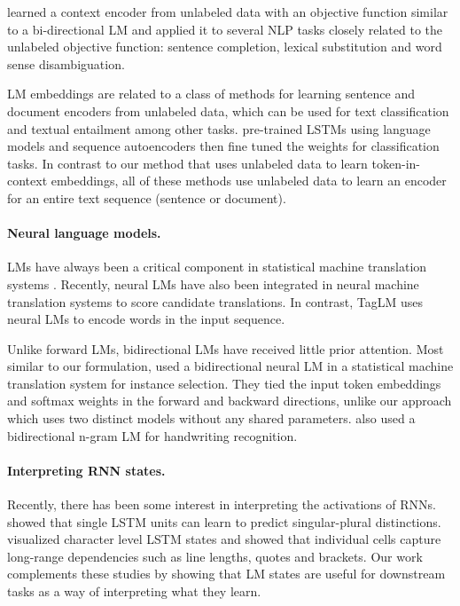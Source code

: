 \documentclass[11pt,a4paper]{article}
\newcommand\wacomment[1]{\textcolor{blue}{\textbf{[#1] --\textsc{Waleed}}}}
\begin{document}
\citet{Melamud2016context2vecLG} learned a context encoder from unlabeled data with an objective function similar to a bi-directional LM and applied
it to several NLP tasks closely related to the unlabeled objective function: sentence completion, lexical substitution and word sense disambiguation.


LM embeddings are related to a class of methods \citep[e.g.,][]{Le2014DistributedRO,Kiros2015SkipThoughtV,Hill2016LearningDR} for learning sentence and document encoders from unlabeled data, which can be used for text classification and textual entailment among other tasks.  \citet{Dai2015SemisupervisedSL} pre-trained LSTMs using language models and sequence autoencoders then fine tuned the weights for classification tasks.  In contrast to our method that uses unlabeled data to learn token-in-context embeddings, all of these methods use unlabeled data to learn an encoder for an entire text sequence (sentence or document).

\paragraph{Neural language models.}
LMs have always been a critical component in statistical machine translation systems \citep{koehn:09}.
Recently, neural LMs \citep{bengio:03,mikolov:10} have also been integrated in neural machine translation systems \citep[e.g.,][]{kalchbrenner:13,devlin:14} to score candidate translations.
In contrast, TagLM uses neural LMs to encode words in the input sequence.

Unlike forward LMs, bidirectional LMs have received little prior attention.
Most similar to our formulation, \citet{Peris2015ABR} used a bidirectional
neural LM in a statistical machine translation system for instance selection.
They tied the input token embeddings and softmax weights in
the forward and backward directions, unlike our approach which uses
two distinct models without any shared parameters.
\citet{frinken:12} also used a bidirectional n-gram LM for
handwriting recognition.


\paragraph{Interpreting RNN states.}
Recently, there has been some interest in interpreting the activations of RNNs. \citet{Linzen2016AssessingTA} showed that single LSTM units
can learn to predict singular-plural distinctions.  \citet{Karpathy2015VisualizingAU} visualized character level LSTM states and showed that individual cells capture long-range dependencies such as line lengths, quotes and brackets.  Our work complements these studies by showing that LM states are useful for downstream tasks as a way of interpreting what they learn.
\end{document}
